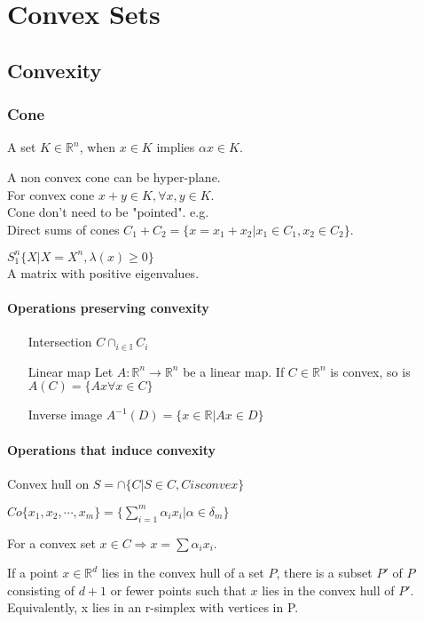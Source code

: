 \documentclass[11pt,fleqn]{book} %
\def\R{\mathbb{R}}
\begin{document}
\chapter{Convex Sets}
\section{Convexity}
\subsection{Cone}
\begin{definition}[Cone]
A set $K \in \R^n$, when $x \in K $ implies $\alpha x \in K$.
\end{definition}
A non convex cone can be hyper-plane.\\
For convex cone $x + y \in K, \forall x,y \in K$.\\
Cone don't need to be "pointed". e.g. \\
Direct sums of cones $C_1 + C_2 = \{ x = x_1+x_2 | x_1 \in C_1, x_2 \in C_2 \}$.\\
\begin{example}
$S_1^n  \{ X | X=X^n ,\lambda(x) \ge 0\}$\\
A matrix with positive eigenvalues.
\end{example}

\subsubsection{Operations preserving convexity}
\begin{itemize}
\item[Intersection] $C  \cap_{i \in \mathbb{I}}C_i$
\item[Linear map] Let $A : \mathbb{R}^n \to  \R^n$ be a linear map. If $C \in \R^n$ is convex, so is $A(C) = \{Ax \forall x \in C \}$
\item[Inverse image] $A^{-1}(D) = \{ x \in \R |Ax \in D \}$
\end{itemize}

\subsubsection{Operations that induce convexity}
Convex hull on $S = \cap \{C | S\in C, C is convex\}$\\
\begin{example}
$Co \{ x_1,x_2,\cdots,x_m\} = \{ \sum_{i=1}^m \alpha_i x_i | \alpha \in \delta_m \}$
\end{example}
For a convex set $x \in C \Rightarrow x = \sum \alpha_i x_i$. 
\begin{theorem}
If a point $x \in \R^d$ lies in the convex hull of a set $P$, there is a subset $P'$ of $P$ consisting of $d + 1$ or fewer points such that $x$ lies in the convex hull of $P'$. Equivalently, x lies in an r-simplex with vertices in P.
\end{theorem}
\end{document}
